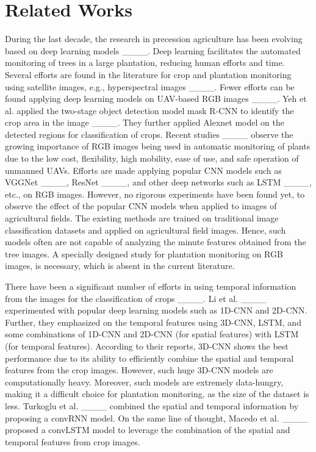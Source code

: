 \section{Related Works}
During the last decade, the research in precession agriculture has been evolving based on deep learning models ____. Deep learning facilitates the automated monitoring of trees in a large plantation, reducing human efforts and time. Several efforts are found in the literature for crop and plantation monitoring using satellite images, e.g., hyperspectral images ____. Fewer efforts can be found applying deep learning models on UAV-based RGB images ____. Yeh et al. applied the two-stage object detection model mask R-CNN to identify the crop area in the image ____. They further applied Alexnet model on the detected regions for classification of crops. Recent studies ____ observe the growing importance of RGB images being used in automatic monitoring of plants due to the low cost, flexibility, high mobility, ease of use, and safe operation of unmanned UAVs. Efforts are made applying popular CNN models such as VGGNet ____, ResNet ____, and other deep networks such as LSTM ____, etc., on RGB images. However, no rigorous experiments have been found yet, to observe the effect of the popular CNN models when applied to images of agricultural fields. The existing methods are trained on traditional image classification datasets and applied on agricultural field images. Hence, such models often are not capable of analyzing the minute features obtained from the tree images. A specially designed study for plantation monitoring on RGB images, is necessary, which is absent in the current literature.

There have been a significant number of efforts in using temporal information from the images for the classification of crops ____. Li et al. ____ experimented with popular deep learning models such as 1D-CNN and 2D-CNN. Further, they emphasized on the temporal features using 3D-CNN, LSTM, and some combinations of 1D-CNN and 2D-CNN (for spatial features) with LSTM (for temporal features). According to their reports, 3D-CNN shows the best performance due to its ability to efficiently combine the spatial and temporal features from the crop images. However, such huge 3D-CNN models are computationally heavy. Moreover, such models are extremely data-hungry, making it a difficult choice for plantation monitoring, as the size of the dataset is less. Turkoglu et al. ____ combined the spatial and temporal information by proposing a convRNN model. On the same line of thought, Macedo et al. ____ proposed a convLSTM model to leverage the combination of the spatial and temporal features from crop images.


